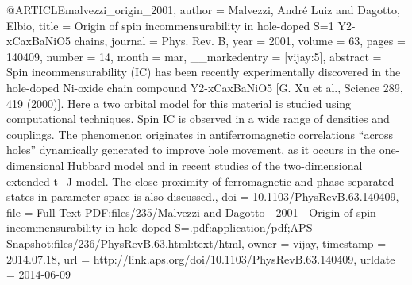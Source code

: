 @ARTICLE{malvezzi_origin_2001,
  author = {Malvezzi, André Luiz and Dagotto, Elbio},
  title = {Origin of spin incommensurability in hole-doped S=1 Y2-{xCaxBaNiO}5
	chains},
  journal = {Phys. Rev. B},
  year = {2001},
  volume = {63},
  pages = {140409},
  number = {14},
  month = mar,
  __markedentry = {[vijay:5]},
  abstract = {Spin incommensurability ({IC}) has been recently experimentally discovered
	in the hole-doped Ni-oxide chain compound Y2-{xCaxBaNiO}5 [G. Xu
	et al., Science 289, 419 (2000)]. Here a two orbital model for this
	material is studied using computational techniques. Spin {IC} is
	observed in a wide range of densities and couplings. The phenomenon
	originates in antiferromagnetic correlations “across holes” dynamically
	generated to improve hole movement, as it occurs in the one-dimensional
	Hubbard model and in recent studies of the two-dimensional extended
	t−J model. The close proximity of ferromagnetic and phase-separated
	states in parameter space is also discussed.},
  doi = {10.1103/PhysRevB.63.140409},
  file = {Full Text PDF:files/235/Malvezzi and Dagotto - 2001 - Origin of spin incommensurability in hole-doped S=.pdf:application/pdf;APS Snapshot:files/236/PhysRevB.63.html:text/html},
  owner = {vijay},
  timestamp = {2014.07.18},
  url = {http://link.aps.org/doi/10.1103/PhysRevB.63.140409},
  urldate = {2014-06-09}
}

